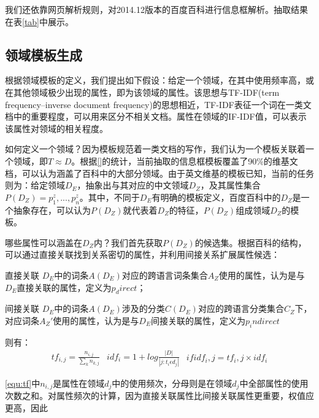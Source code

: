 我们还依靠网页解析规则，对2014.12版本的百度百科进行信息框解析。抽取结果在表\ref{tab}中展示。

\subsection{领域模板生成}
\label{sec:domain-template}
根据领域模板的定义，我们提出如下假设：给定一个领域，在其中使用频率高，或在其他领域极少出现的属性，即为该领域的属性。该思想与TF-IDF(term frequency–inverse document frequency)的思想相近，TF-IDF表征一个词在一类文档中的重要程度，可以用来区分不相关文档。属性在领域的IF-IDF值，可以表示该属性对领域的相关程度。

如何定义一个领域？因为模板规范着一类文档的写作，我们认为一个模板关联着一个领域，即$T \approx D$。根据\ref{}的统计，当前抽取的信息框模板覆盖了90\%的维基文档，可以认为涵盖了百科中的大部分领域。由于英文维基的模板已知，当前的任务则为：给定领域$D_E$，抽象出与其对应的中文领域$D_Z$，及其属性集合$P(D_Z)={p_1^z,...,p_n^z}$。其中，不同于$D_E$有明确的模板定义，百度百科中的$D_Z$是一个抽象存在，可以认为$P(D_Z)$就代表着$D_Z$的特征，$P(D_Z)$组成领域$D_Z$的模板。

哪些属性可以涵盖在$D_Z$内？我们首先获取$P(D_Z)$的候选集。根据百科的结构，可以通过直接关联找到关系密切的属性，并利用间接关系扩展属性候选：

{\heiti 直接关联} $D_E$中的词条$A(D_E)$对应的跨语言词条集合$A_Z$使用的属性，认为是与$D_E$直接关联的属性，定义为$p_direct$；

{\heiti 间接关联} $D_E$中的词条$A(D_E)$涉及的分类$C(D_E)$对应的跨语言分类集合$C_Z$下，对应词条$A_Z'$使用的属性，认为是与$D_E$间接关联的属性，定义为$p_indirect$

则有：
\begin{equation}

\begin{align}
\label{equ:tf}
tf_{i,j}=\frac{n_{i,j}}{\sum_{k}{n_{k,j}}} 
\end{align}

\begin{align}
\label{equ:idf}
idf_{i}=1+log\frac{\left | D \right |}{\left | j:t_i  \epsilon d_j \right |} 
\end{align}

\begin{align}
\label{equ:tfidf}
ifidf_i,j=tf_i,j\times idf_i
\end{align}

\end{equation}

\ref{equ:tf}中$n_{i,j}$是属性在领域$d_{j}$中的使用频次，分母则是在领域$d_{j}$中全部属性的使用次数之和。对属性频次的计算，因为直接关联属性比间接关联属性更重要，权值应更高，因此


